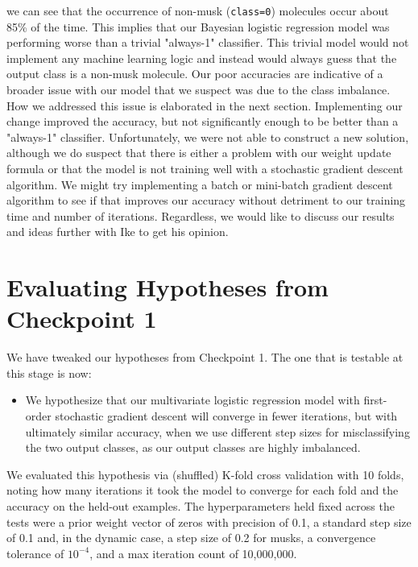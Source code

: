 \documentclass[12pt]{article}
\begin{document}
we can see that the occurrence of non-musk (\texttt{class=0}) molecules occur about 85\% of the time. This implies that our Bayesian logistic regression model was performing worse than a trivial "always-1" classifier. This trivial model would not implement any machine learning logic and instead would always guess that the output class is a non-musk molecule. Our poor accuracies are indicative of a broader issue with our model that we suspect was due to the class imbalance. How we addressed this issue is elaborated in the next section. Implementing our change improved the accuracy, but not significantly enough to be better than a "always-1" classifier. Unfortunately, we were not able to construct a new solution, although we do suspect that there is either a problem with our weight update formula or that the model is not training well with a stochastic gradient descent algorithm. We might try implementing a batch or mini-batch gradient descent algorithm to see if that improves our accuracy without detriment to our training time and number of iterations. Regardless, we would like to discuss our results and ideas further with Ike to get his opinion.


\section{Evaluating Hypotheses from Checkpoint 1}

We have tweaked our hypotheses from Checkpoint 1. The one that is testable at this stage is now:

\begin{itemize}
    \item We hypothesize that our multivariate logistic regression model with first-order stochastic gradient descent will converge in fewer iterations, but with ultimately similar accuracy, when we use different step sizes for misclassifying the two output classes, as our output classes are highly imbalanced.
\end{itemize}

We evaluated this hypothesis via (shuffled) K-fold cross validation with 10 folds, noting how many iterations it took the model to converge for each fold and the accuracy on the held-out examples. The hyperparameters held fixed across the tests were a prior weight vector of zeros with precision of 0.1, a standard step size of 0.1 and, in the dynamic case, a step size of 0.2 for musks, a convergence tolerance of $10^{-4}$, and a max iteration count of 10,000,000.
\end{document}
